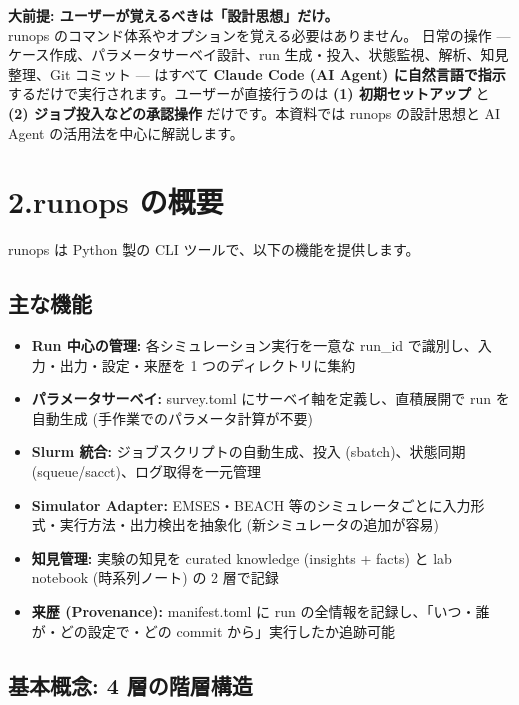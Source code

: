 \documentclass[a4paper,11pt]{article}
\newenvironment{infobox}{%
  \medskip\noindent
  \fboxrule=0.5pt\fboxsep=8pt
  \fcolorbox{infoframe}{infobg}\bgroup\minipage{\dimexpr\linewidth-2\fboxsep-2\fboxrule}
}{%
  \endminipage\egroup\medskip
}
\begin{document}
\begin{infobox}
\textbf{大前提: ユーザーが覚えるべきは「設計思想」だけ。}\\[4pt]
runops のコマンド体系やオプションを覚える必要はありません。
日常の操作 --- ケース作成、パラメータサーベイ設計、run 生成・投入、状態監視、解析、知見整理、Git コミット --- はすべて \textbf{Claude Code (AI Agent) に自然言語で指示} するだけで実行されます。ユーザーが直接行うのは \textbf{(1) 初期セットアップ} と \textbf{(2) ジョブ投入などの承認操作} だけです。本資料では runops の設計思想と AI Agent の活用法を中心に解説します。
\end{infobox}

\section*{\color{darkblue} 2.\quad runops の概要}

runops は Python 製の CLI ツールで、以下の機能を提供します。

\subsection*{\color{accent} 主な機能}

\begin{itemize}[nosep]
  \item \textbf{Run 中心の管理:} 各シミュレーション実行を一意な run\_id で識別し、入力・出力・設定・来歴を 1 つのディレクトリに集約
  \item \textbf{パラメータサーベイ:} survey.toml にサーベイ軸を定義し、直積展開で run を自動生成 (手作業でのパラメータ計算が不要)
  \item \textbf{Slurm 統合:} ジョブスクリプトの自動生成、投入 (sbatch)、状態同期 (squeue/sacct)、ログ取得を一元管理
  \item \textbf{Simulator Adapter:} EMSES・BEACH 等のシミュレータごとに入力形式・実行方法・出力検出を抽象化 (新シミュレータの追加が容易)
  \item \textbf{知見管理:} 実験の知見を curated knowledge (insights + facts) と lab notebook (時系列ノート) の 2 層で記録
  \item \textbf{来歴 (Provenance):} manifest.toml に run の全情報を記録し、「いつ・誰が・どの設定で・どの commit から」実行したか追跡可能
\end{itemize}

\subsection*{\color{accent} 基本概念: 4 層の階層構造}
\end{document}
